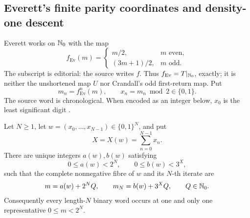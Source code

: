 \subsection{Everett's finite parity coordinates and density-one descent}
\label{subsec:Everett-1977}

Everett works on \(\mathbb{N}_{0}\) with the map
\begin{equation}
\label{eq:Everett-f}
 f_{\mathrm{Ev}}(m)=
 \begin{cases}
  m/2,&m\text{ even},\\
  (3m+1)/2,&m\text{ odd}.
 \end{cases}
\end{equation}
The subscript is editorial: the source writes \(f\).  Thus
\(f_{\mathrm{Ev}}=T|_{\mathbb{N}_{0}}\), exactly; it is neither the unshortened map
\(U\) nor Crandall's odd first-return map.  Put
\begin{equation}
\label{eq:Everett-parity-coordinates}
 m_n=f_{\mathrm{Ev}}^n(m),
 \qquad
 x_n=m_n\bmod2\in\{0,1\}.
\end{equation}
The source word is chronological.  When encoded as an integer below, \(x_0\)
is the least significant digit \cite[pp.~42--43]{Everett1977}.

\begin{theorem}
\label{thm:Everett-finite-fibres}
Let \(N\ge1\), let
\(w=(x_0,\ldots,x_{N-1})\in\{0,1\}^N\), and put
\[
 X=X(w)=\sum_{n=0}^{N-1}x_n.
\]
There are unique integers \(a(w),b(w)\) satisfying
\[
 0\le a(w)<2^N,
 \qquad
 0\le b(w)<3^X,
\]
such that the complete nonnegative fibre of \(w\) and its \(N\)-th iterate
are
\begin{equation}
\label{eq:Everett-affine-fibre}
 m=a(w)+2^NQ,
 \qquad
 m_N=b(w)+3^XQ,
 \qquad Q\in\mathbb{N}_{0}.
\end{equation}
Consequently every length-\(N\) binary word occurs at one and only one
representative \(0\le m<2^N\).
\end{theorem}

